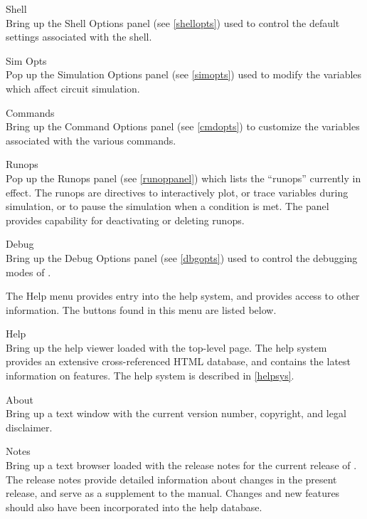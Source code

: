 \begin{description}
\item{\cb Shell}\\
Bring up the {\cb Shell Options} panel (see \ref{shellopts}) used to
control the default settings associated with the {\WRspice} shell.

\item{\cb Sim Opts}\\
Pop up the {\cb Simulation Options} panel (see \ref{simopts}) used
to modify the variables which affect circuit simulation.

\item{\cb Commands}\\
Bring up the {\cb Command Options} panel (see \ref{cmdopts}) to
customize the variables associated with the various commands.

\item{\cb Runops}\\
Pop up the {\cb Runops} panel (see \ref{runoppanel}) which lists the
``runops'' currently in effect.  The runops are directives to
interactively plot, or trace variables during simulation, or to pause
the simulation when a condition is met.  The panel provides capability
for deactivating or deleting runops.

\item{\cb Debug}\\
Bring up the {\cb Debug Options} panel (see \ref{dbgopts}) used to
control the debugging modes of {\WRspice}.
\end{description}

The {\cb Help} menu provides entry into the help system, and provides
access to other information.  The buttons found in this menu are listed
below.

\begin{description}
\item{\cb Help}\\
Bring up the help viewer loaded with the top-level page.  The help
system provides an extensive cross-referenced HTML database, and
contains the latest information on {\WRspice} features.  The help
system is described in \ref{helpsys}.

\item{\cb About}\\
Bring up a text window with the current {\WRspice} version number,
copyright, and legal disclaimer.

\item{\cb Notes}\\
Bring up a text browser loaded with the release notes for the current
release of {\WRspice}.  The release notes provide detailed information
about changes in the present release, and serve as a supplement to the
manual.  Changes and new features should also have been incorporated
into the help database.
\end{description}

